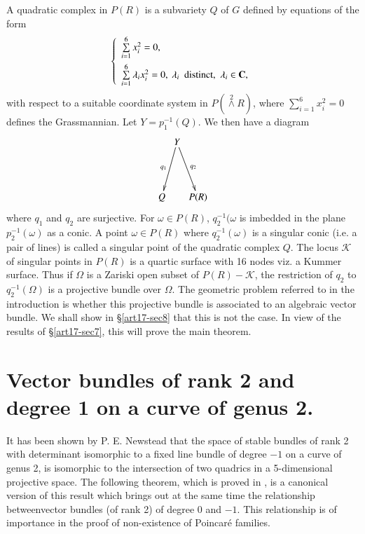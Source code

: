 A quadratic complex in $P(R)$ is a subvariety $Q$ of $G$ defined by equations of the form
$$
\left\{
\begin{array}{l}
\sum\limits^{6}_{i=1}x^{2}_{i}=0,\\[10pt]
\sum\limits^{6}_{i=1}\lambda_{i}x^{2}_{i}=0, \ \lambda_{i}\text{~ distinct,~ } \lambda_{i}\in \mathbf{C},
\end{array}\right.
$$
with respect to a suitable coordinate system in $P({\displaystyle{\mathop{\wedge}\limits^{2}}}R)$, where $\sum\limits^{6}_{i=1}x^{2}_{i}=0$ defines the Grassmannian. Let $Y=p^{-1}_{1}(Q)$. We then have a diagram
\[
\xymatrix@C=.1cm@R=1.5cm{
 & Y\ar[dl]_-{q_{1}}\ar[dr]^-{q_{2}} &\\
Q & & P(R)
}
\]
where $q_{1}$ and $q_{2}$ are surjective. For $\omega \in P(R)$, $q^{-1}_{2}(\omega$ is imbedded in the plane $p^{-1}_{2}(\omega)$ as a conic. A point $\omega\in P(R)$ where $q^{-1}_{2}(\omega)$ is a singular conic (i.e. a pair of lines) is called a singular point of the quadratic complex $Q$. The locus $\mathscr{K}$ of singular points in $P(R)$ is a quartic surface with 16 nodes viz. a Kummer surface. Thus if $\Omega$ is a Zariski open subset of $P(R)-\mathscr{K}$, the restriction of $q_{2}$ to $q^{-1}_{2}(\Omega)$ is a projective bundle over $\Omega$. The geometric problem referred to in the introduction is whether this projective bundle is associated to an algebraic vector bundle. We shall show in \S\ref{art17-sec8} that this is not the case. In view of the results of \S\ref{art17-sec7}, this will prove the main theorem.

\eject

\section{Vector bundles of rank 2 and degree 1 on a curve of genus 2.}\label{art17-sec6}

It has been shown by P. E. Newstead \cite{art17-key6} that the space of stable bundles of rank 2 with determinant isomorphic to a fixed line bundle of degree $-1$ on a curve of genus 2, is isomorphic to the intersection of two quadrics in a 5-dimensional projective space. The following theorem, which is proved in \cite{art17-key3}, is a canonical version of this result which brings out at the same time the relationship between\pageoriginale vector bundles (of rank 2) of degree $0$ and $-1$. This relationship is of importance in the proof of non-existence of Poincar\'e families.

